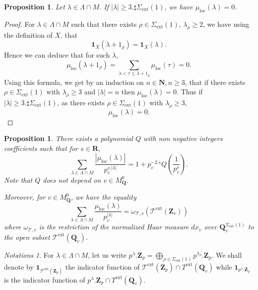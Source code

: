 \documentclass{proc-l}
\newcommand{\R}{\mathbf{R}}
\newcommand{\Z}{\mathbf{Z}}
\newcommand{\N}{\mathbf{N}}
\newcommand{\Q}{\mathbf{Q}}
\DeclareMathOperator{\loc}{loc}
\DeclareMathOperator{\ext}{ext}
\newcommand{\stackT}{\mathcal{T}}
\newcommand{\w}{\omega}
\newtheorem{prop}[theorem]{Proposition}
\theoremstyle{definition}
\theoremstyle{remark}
\newtheorem{Notations}[theorem]{Notations}
\numberwithin{equation}{section}
\begin{document}
\begin{prop}\label{proposition_local_mobius_prop_two}
    Let $\lambda \in \Lambda \cap M$. If $|\lambda| \geqslant 3.\sharp \Sigma_{\ext}(1)$, we have $\mu_{\loc}(\lambda) = 0 $.
\end{prop}

\begin{proof}
    For $\lambda \in \Lambda \cap M$ such that there exists $\rho \in \Sigma_{\ext}(1)$, $\lambda_{\rho} \geqslant 2$, we have using the definition of $X$, that $$\mathbf{1}_X(\lambda + 1_{\rho}) = \mathbf{1}_X(\lambda).  $$Hence we can deduce that for such $\lambda$, $$\mu_{\loc}(\lambda + 1_{\rho}) = \sum\limits_{\lambda < \tau \leqslant \lambda + 1_{\rho}} \mu_{\loc}(\tau) = 0 . $$Using this formula, we get by an induction on $n \in \N, n \geqslant 3$, that if there exists $\rho \in \Sigma_{\ext}(1)$ with $\lambda_{\rho} \geqslant 3$ and $|\lambda| = n$ then $\mu_{\loc}(\lambda) = 0$. Thus if $|\lambda| \geqslant 3 . \sharp \Sigma_{\ext}(1)$, as there exists $\rho \in \Sigma_{\ext}(1)$ with $\lambda_{\rho} \geqslant 3$, $$\mu_{\loc}(\lambda) = 0 .$$
\end{proof}

\begin{prop}\label{proposition_local_study_of_mobius_function}
   There exists a polynomial $Q$ with non negative integers coefficients such that for $s \in \R$, $$ \sum\limits_{\lambda \in \Lambda \cap M} \frac{|\mu_{\loc}(\lambda)|}{p_v^{s.|\lambda|}} = 1 + p_v^{-2.s} Q(\frac{1}{p_v^s}) .$$Note that $Q$ does not depend on $v \in M_{\Q}^0$.

   Moreover, for $v \in M_{\Q}^0$, we have the equality $$\sum\limits_{\lambda \in \Lambda \cap M} \frac{\mu_{\loc}(\lambda)}{p_v^{|\lambda|}} = \w_{\stackT,v}(\stackT^{\ext}(\Z_v)) $$ where $\w_{\stackT,v}$ is the restriction of the normalized Haar measure $d x_v$ over $\Q_v^{\Sigma_{\ext}(1)}$ to the open subset $\stackT^{\ext}(\Q_v)$.
\end{prop}

\begin{Notations}
    For $\lambda \in \Lambda \cap M$, let us write $p^{\lambda} . \Z_p = \bigoplus\limits_{\rho \in \Sigma_{\ext}(1)} p^{\lambda_{\rho}} . \Z_p .$ We shall denote by $\mathbf{1}_{\stackT^{\ext}(\Z_p)}$  the indicator function of $\stackT^{\ext}(\Z_p) \cap T^{\ext}(\Q_v)$ while $\mathbf{1}_{p^{\lambda} . \Z_p}$ is the indicator function of $p^{\lambda} . \Z_p \cap T^{\ext}(\Q_v)$.
\end{Notations}
\end{document}
